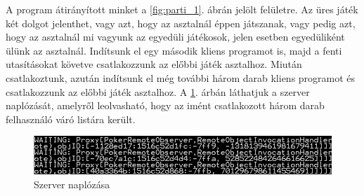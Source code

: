 A program átirányított minket a \ref{fig:parti_1}. ábrán jelölt felületre. Az üres játék két dolgot jelenthet, vagy azt, hogy az asztalnál éppen játszanak, vagy pedig azt, hogy az asztalnál mi vagyunk az egyedüli játékosok, jelen esetben egyedüliként ülünk az asztalnál. Indítsunk el egy második kliens programot is, majd a fenti utasításokat követve csatlakozzunk az előbbi játék asztalhoz. Miután csatlakoztunk, azután indítsunk el még további három darab kliens programot és csatlakozzunk az előbbi játék asztalhoz. A \ref{fig:sv_log}. árbán láthatjuk a szerver naplózását, amelyről leolvasható, hogy az imént csatlakozott három darab felhasználó váró listára került. \\
\begin{figure}[h!]
  \caption{Szerver naplózása}
  \label{fig:sv_log}
  \centering
    \includegraphics[width=\textwidth]{user-documentation/images/sv_log.jpg}
\end{figure}

